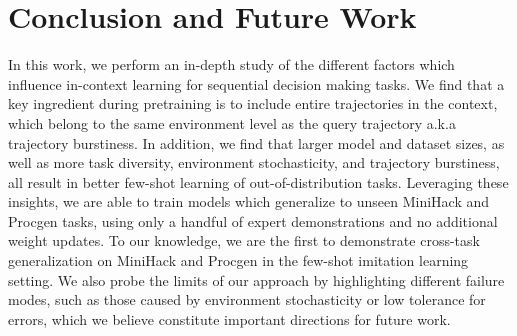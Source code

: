 \section{Conclusion and Future Work}

In this work, we perform an in-depth study of the different factors which influence in-context learning for sequential decision making tasks. 
We find that a key ingredient during pretraining is to include entire trajectories in the context, which belong to the same environment level as the query trajectory a.k.a trajectory burstiness. 
In addition, we find that larger model and dataset sizes, as well as more task diversity, environment stochasticity, and trajectory burstiness, all result in better few-shot learning of out-of-distribution tasks.
Leveraging these insights, we are able to train models which generalize to unseen MiniHack and Procgen tasks, using only a handful of expert demonstrations and no additional weight updates. To our knowledge, we are the first to demonstrate cross-task generalization on MiniHack and Procgen in the few-shot imitation learning setting. We also probe the limits of our approach by highlighting different failure modes, such as those caused by environment stochasticity or low tolerance for errors, which we believe constitute important directions for future work. 
